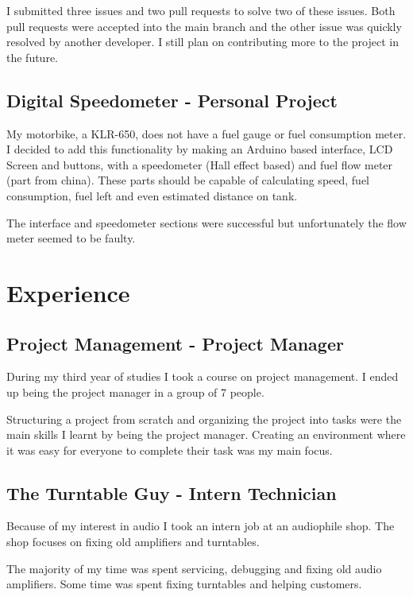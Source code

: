 \documentclass[8pt]{extarticle}
\begin{document}
\begin{multicols}{2}
I submitted three issues and two pull requests to solve two
of these issues. Both pull requests were accepted into the
main branch and the other issue was quickly resolved by
another developer. I still plan on contributing more to the
project in the future.

\subsection{Digital Speedometer - Personal Project}

My motorbike, a KLR-650, does not have a fuel gauge or fuel
consumption meter. I decided to add this functionality by
making an Arduino based interface, LCD Screen and
buttons, with a speedometer (Hall effect based) and fuel
flow meter (part from china). These parts should be capable
of calculating speed, fuel consumption, fuel left and even
estimated distance on tank.

The interface and speedometer sections were successful
but unfortunately the flow meter seemed to be faulty.

\vfill\null
\columnbreak
\section{Experience}

\subsection{Project Management - Project Manager}

During my third year of studies I took a course on project
management. I ended up being the project manager in a
group of 7 people.

Structuring a project from scratch and organizing the project
into tasks were the main skills I learnt by being the project
manager. Creating an environment where it was easy for
everyone to complete their task was my main focus.

\subsection{The Turntable Guy - Intern Technician}

Because of my interest in audio I took an intern job at an
audiophile shop. The shop focuses on fixing old amplifiers
and turntables.

The majority of my time was spent servicing, debugging and
fixing old audio amplifiers. Some time was spent fixing
turntables and helping customers.


\end{multicols}
\end{document}
